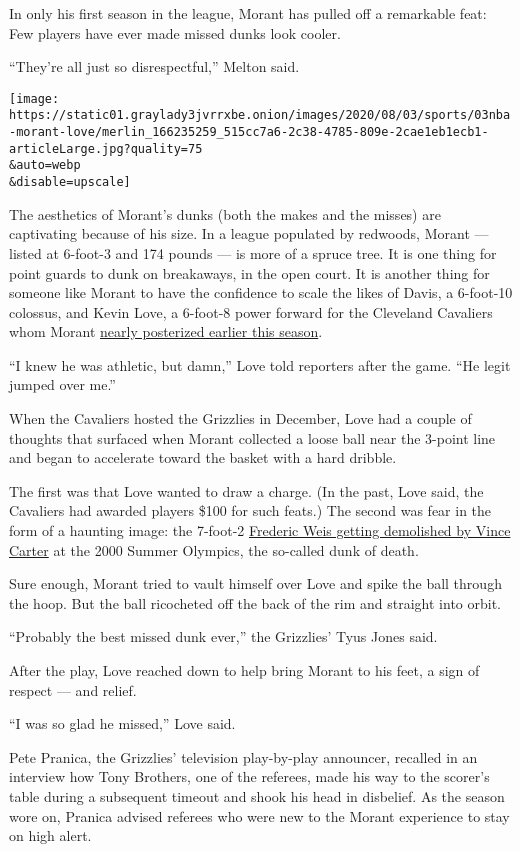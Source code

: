 In only his first season in the league, Morant has pulled off a
remarkable feat: Few players have ever made missed dunks look cooler.

``They're all just so disrespectful,'' Melton said.

\texttt{[image: https://static01.graylady3jvrrxbe.onion/images/2020/08/03/sports/03nba-morant-love/merlin\_166235259\_515cc7a6-2c38-4785-809e-2cae1eb1ecb1-articleLarge.jpg?quality=75\\\&auto=webp\\\&disable=upscale]}

The aesthetics of Morant's dunks (both the makes and the misses) are
captivating because of his size. In a league populated by redwoods,
Morant --- listed at 6-foot-3 and 174 pounds --- is more of a spruce
tree. It is one thing for point guards to dunk on breakaways, in the
open court. It is another thing for someone like Morant to have the
confidence to scale the likes of Davis, a 6-foot-10 colossus, and Kevin
Love, a 6-foot-8 power forward for the Cleveland Cavaliers whom Morant
\href{https://www.youtube.com/watch?v=SJvHeuCLJAs}{nearly posterized
earlier this season}.

``I knew he was athletic, but damn,'' Love told reporters after the
game. ``He legit jumped over me.''

When the Cavaliers hosted the Grizzlies in December, Love had a couple
of thoughts that surfaced when Morant collected a loose ball near the
3-point line and began to accelerate toward the basket with a hard
dribble.

The first was that Love wanted to draw a charge. (In the past, Love
said, the Cavaliers had awarded players \$100 for such feats.) The
second was fear in the form of a haunting image: the 7-foot-2
\href{https://www.youtube.com/watch?v=k_uZeCymShQ}{Frederic Weis getting
demolished by Vince Carter} at the 2000 Summer Olympics, the so-called
dunk of death.

Sure enough, Morant tried to vault himself over Love and spike the ball
through the hoop. But the ball ricocheted off the back of the rim and
straight into orbit.

``Probably the best missed dunk ever,'' the Grizzlies' Tyus Jones said.

After the play, Love reached down to help bring Morant to his feet, a
sign of respect --- and relief.

``I was so glad he missed,'' Love said.

Pete Pranica, the Grizzlies' television play-by-play announcer, recalled
in an interview how Tony Brothers, one of the referees, made his way to
the scorer's table during a subsequent timeout and shook his head in
disbelief. As the season wore on, Pranica advised referees who were new
to the Morant experience to stay on high alert.

